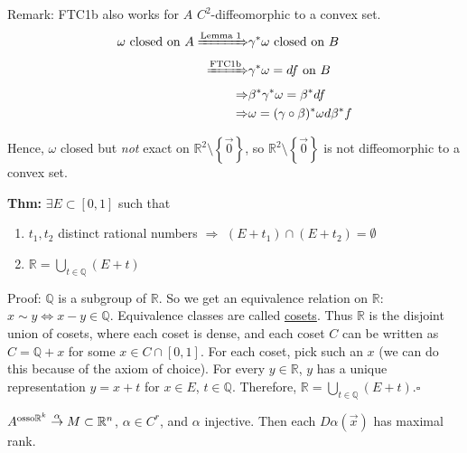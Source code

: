 \documentclass[10pt,letterpaper]{article}
\newcommand{\n}{\hfill\break}
\newcommand{\up}{\vspace{-\baselineskip}}
\newcommand{\thm}[1]{\par\noindent\settowidth{\hangindent}{\textbf{Thm: }}\textbf{Thm: }#1\n}
\newcommand{\proven}{\;$\square$\n}
\newcommand{\ptxt}[1]{\textrm{\textnormal{#1}}}
\newcommand{\set}[1]{\left\{#1\right\}}
\newcommand{\rationals}{\mathbb{Q}}
\newcommand{\Q}{\rationals}
\newcommand{\reals}{\mathbb{R}}
\newcommand{\R}{\reals}
\newcommand{\cut}{\setminus}
\newcommand{\of}{\circ}
\begin{document}
\par\noindent Remark: FTC1b also works for $A$ $C^{2}$-diffeomorphic to a convex set.
\begin{align*}
\omega\ptxt{ closed on }A\xRightarrow{\ptxt{Lemma 1}} & \gamma^{*}\omega\ptxt{ closed on }B\\
\xRightarrow{\ptxt{FTC1b}} & \gamma^{*}\omega=df\ptxt{ on }B\\
\Rightarrow & \beta^{*}\gamma^{*}\omega=\beta^{*}df\\
\Rightarrow & \omega=(\gamma\of\beta)^{*}\omega{}d\beta^{*}f
\end{align*}

\par\noindent Hence, $\omega$ closed but \textit{not} exact on $\R^{2}\cut\set{\vec{0}}$, so $\R^{2}\cut\set{\vec{0}}$ is not diffeomorphic to a convex set.\n

\thm{$\exists{}E\subset[0,1]$ such that
\begin{enumerate}[label=(\arabic*),leftmargin=1.5cm]
	\item $t_{1},t_{2}$ distinct rational numbers $\Rightarrow$ $(E+t_{1})\cap(E+t_{2})=\emptyset$
	\item $\displaystyle\R=\bigcup_{t\in\Q}(E+t)$
\end{enumerate}\up\n
Proof: $\Q$ is a subgroup of $\R$. So we get an equivalence relation on $\R$: $x\sim{}y\Leftrightarrow{}x-y\in\Q$. Equivalence classes are called \underline{cosets}. Thus $\R$ is the disjoint union of cosets, where each coset is dense, and each coset $C$ can be written as $C=\Q+x$ for some $x\in{}C\cap[0,1]$. For each coset, pick such an $x$ (we can do this because of the axiom of choice).\n
For every $y\in\R$, $y$ has a unique representation $y=x+t$ for $x\in{}E$, $t\in\Q$.\n
Therefore, $\displaystyle\R=\bigcup_{t\in\Q}(E+t)$.\proven}

\par\noindent $A^{\ptxt{osso}\R^{k}}\overset{\alpha}{\to}M\subset\R^{n}$, $\alpha\in{}C^{r}$, and $\alpha$ injective. Then each $D\alpha(\vec{x})$ has maximal rank.
\end{document}
